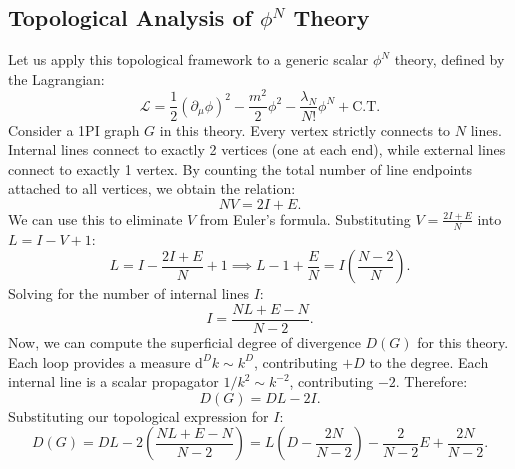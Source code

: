 \subsection{Topological Analysis of $\phi^N$ Theory}
Let us apply this topological framework to a generic scalar $\phi^N$ theory, defined by the Lagrangian:
\[
    \mathcal{L} = \frac{1}{2}(\partial_\mu \phi)^2 - \frac{m^2}{2}\phi^2 - \frac{\lambda_N}{N!}\phi^N + \text{C.T.}
\]
Consider a 1PI graph $G$ in this theory. Every vertex strictly connects to $N$ lines. Internal lines connect to exactly 2 vertices (one at each end), while external lines connect to exactly 1 vertex. By counting the total number of line endpoints attached to all vertices, we obtain the relation:
\[
    N V = 2I + E.
\]
We can use this to eliminate $V$ from Euler's formula. Substituting $V = \frac{2I + E}{N}$ into $L = I - V + 1$:
\[
    L = I - \frac{2I + E}{N} + 1 \implies L - 1 + \frac{E}{N} = I \left( \frac{N-2}{N} \right).
\]
Solving for the number of internal lines $I$:
\[
    I = \frac{NL + E - N}{N-2}.
\]
Now, we can compute the superficial degree of divergence $D(G)$ for this theory. Each loop provides a measure $\mathrm{d}^D k \sim k^D$, contributing $+D$ to the degree. Each internal line is a scalar propagator $1/k^2 \sim k^{-2}$, contributing $-2$. Therefore:
\[
    D(G) = D L - 2 I.
\]
Substituting our topological expression for $I$:
\[
    D(G) = D L - 2 \left( \frac{NL + E - N}{N-2} \right) = L \left( D - \frac{2N}{N-2} \right) - \frac{2}{N-2} E + \frac{2N}{N-2}.
\]

